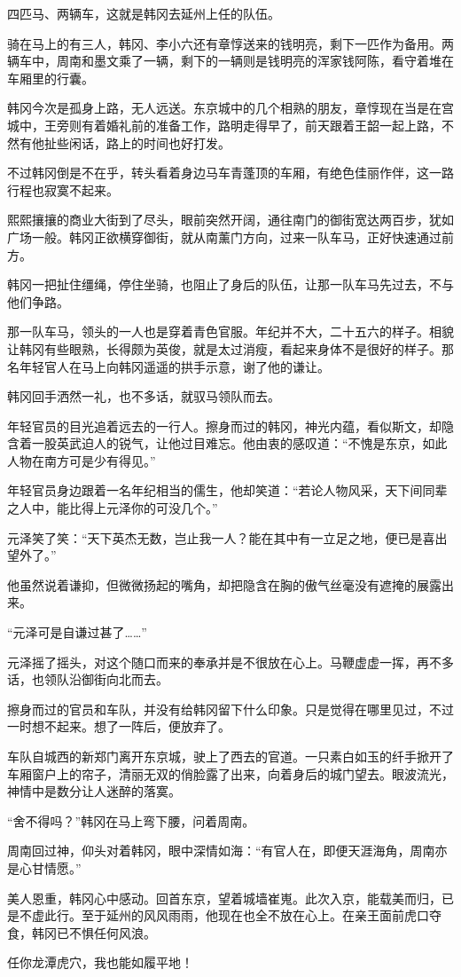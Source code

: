 四匹马、两辆车，这就是韩冈去延州上任的队伍。

骑在马上的有三人，韩冈、李小六还有章惇送来的钱明亮，剩下一匹作为备用。两辆车中，周南和墨文乘了一辆，剩下的一辆则是钱明亮的浑家钱阿陈，看守着堆在车厢里的行囊。

韩冈今次是孤身上路，无人远送。东京城中的几个相熟的朋友，章惇现在当是在宫城中，王旁则有着婚礼前的准备工作，路明走得早了，前天跟着王韶一起上路，不然有他扯些闲话，路上的时间也好打发。

不过韩冈倒是不在乎，转头看着身边马车青蓬顶的车厢，有绝色佳丽作伴，这一路行程也寂寞不起来。

熙熙攘攘的商业大街到了尽头，眼前突然开阔，通往南门的御街宽达两百步，犹如广场一般。韩冈正欲横穿御街，就从南薰门方向，过来一队车马，正好快速通过前方。

韩冈一把扯住缰绳，停住坐骑，也阻止了身后的队伍，让那一队车马先过去，不与他们争路。

那一队车马，领头的一人也是穿着青色官服。年纪并不大，二十五六的样子。相貌让韩冈有些眼熟，长得颇为英俊，就是太过消瘦，看起来身体不是很好的样子。那名年轻官人在马上向韩冈遥遥的拱手示意，谢了他的谦让。

韩冈回手洒然一礼，也不多话，就驭马领队而去。

年轻官员的目光追着远去的一行人。擦身而过的韩冈，神光内蕴，看似斯文，却隐含着一股英武迫人的锐气，让他过目难忘。他由衷的感叹道：“不愧是东京，如此人物在南方可是少有得见。”

年轻官员身边跟着一名年纪相当的儒生，他却笑道：“若论人物风采，天下间同辈之人中，能比得上元泽你的可没几个。”

元泽笑了笑：“天下英杰无数，岂止我一人？能在其中有一立足之地，便已是喜出望外了。”

他虽然说着谦抑，但微微扬起的嘴角，却把隐含在胸的傲气丝毫没有遮掩的展露出来。

“元泽可是自谦过甚了……”

元泽摇了摇头，对这个随口而来的奉承并是不很放在心上。马鞭虚虚一挥，再不多话，也领队沿御街向北而去。

擦身而过的官员和车队，并没有给韩冈留下什么印象。只是觉得在哪里见过，不过一时想不起来。想了一阵后，便放弃了。

车队自城西的新郑门离开东京城，驶上了西去的官道。一只素白如玉的纤手掀开了车厢窗户上的帘子，清丽无双的俏脸露了出来，向着身后的城门望去。眼波流光，神情中是数分让人迷醉的落寞。

“舍不得吗？”韩冈在马上弯下腰，问着周南。

周南回过神，仰头对着韩冈，眼中深情如海：“有官人在，即便天涯海角，周南亦是心甘情愿。”

美人恩重，韩冈心中感动。回首东京，望着城墙崔嵬。此次入京，能载美而归，已是不虚此行。至于延州的风风雨雨，他现在也全不放在心上。在亲王面前虎口夺食，韩冈已不惧任何风浪。

任你龙潭虎穴，我也能如履平地！

